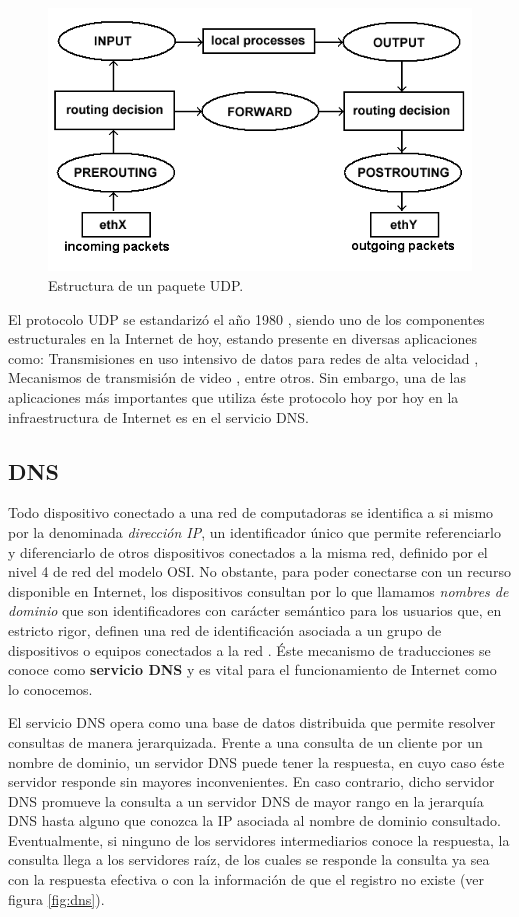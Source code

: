 \begin{figure}[!h]
	\centering
	\includegraphics[scale=.3]{imagenes/netfilterArchitecture}
	\caption{Estructura de un paquete UDP.}
	\label{fig:datagramaudp}
\end{figure}

El protocolo UDP se estandarizó el año 1980 \cite{rfc:udp}, siendo uno de los componentes estructurales en la Internet de hoy, estando presente en diversas aplicaciones como: Transmisiones en uso intensivo de datos para redes de alta velocidad \cite{udp:highbandwidth}, Mecanismos de transmisión de video \cite{udp:video}, entre otros. Sin embargo, una de las aplicaciones más importantes que utiliza éste protocolo hoy por hoy en la infraestructura de Internet es en el servicio DNS.

\subsection{DNS}
Todo dispositivo conectado a una red de computadoras se identifica a si mismo por la denominada \emph{dirección IP}, un identificador único que permite referenciarlo y diferenciarlo de otros dispositivos conectados a la misma red, definido por el nivel 4 de red del modelo OSI. No obstante, para poder conectarse con un recurso disponible en Internet, los dispositivos consultan por lo que llamamos \emph{nombres de dominio} que son identificadores con carácter semántico para los usuarios que, en estricto rigor, definen una red de identificación asociada a un grupo de dispositivos o equipos conectados a la red \cite{wiki:nombre_dominio}. Éste mecanismo de traducciones se conoce como \textbf{servicio DNS} y es vital para el funcionamiento de Internet como lo conocemos.

El servicio DNS opera como una base de datos distribuida que permite resolver consultas de manera jerarquizada. Frente a una consulta de un cliente por un nombre de dominio, un servidor DNS puede tener la respuesta, en cuyo caso éste servidor responde sin mayores inconvenientes. En caso contrario, dicho servidor DNS promueve la consulta a un servidor DNS de mayor rango en la jerarquía DNS hasta alguno que conozca la IP asociada al nombre de dominio consultado. Eventualmente, si ninguno de los servidores intermediarios conoce la respuesta, la consulta llega a los servidores raíz, de los cuales se responde la consulta ya sea con la respuesta efectiva o con la información de que el registro no existe (ver figura \ref{fig:dns}).

